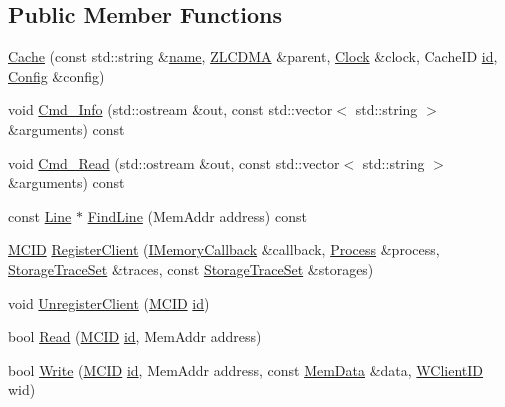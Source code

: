\subsection*{Public Member Functions}
\begin{DoxyCompactItemize}
\item 
\hyperlink{class_simulator_1_1_z_l_c_d_m_a_1_1_cache_a1271ba7cb3727476e32ca8c76d7e1892}{Cache} (const std\+::string \&\hyperlink{mtconf_8c_a8f8f80d37794cde9472343e4487ba3eb}{name}, \hyperlink{class_simulator_1_1_z_l_c_d_m_a}{Z\+L\+C\+D\+M\+A} \&parent, \hyperlink{class_simulator_1_1_clock}{Clock} \&clock, Cache\+I\+D \hyperlink{mtconf_8c_aa3185401f04d30bd505daebf48c39cc5}{id}, \hyperlink{class_config}{Config} \&config)
\item 
void \hyperlink{class_simulator_1_1_z_l_c_d_m_a_1_1_cache_acf2ead20e8ec442bba71b808a29d5930}{Cmd\+\_\+\+Info} (std\+::ostream \&out, const std\+::vector$<$ std\+::string $>$ \&arguments) const 
\item 
void \hyperlink{class_simulator_1_1_z_l_c_d_m_a_1_1_cache_a43d70f72b3ec0494194b17da3f5f6a74}{Cmd\+\_\+\+Read} (std\+::ostream \&out, const std\+::vector$<$ std\+::string $>$ \&arguments) const 
\item 
const \hyperlink{struct_simulator_1_1_z_l_c_d_m_a_1_1_cache_1_1_line}{Line} $\ast$ \hyperlink{class_simulator_1_1_z_l_c_d_m_a_1_1_cache_a909caa91fac1fb46cabe468337b57315}{Find\+Line} (Mem\+Addr address) const 
\item 
\hyperlink{namespace_simulator_a4b5747ff30c62c6373badf3b53b9abf7}{M\+C\+I\+D} \hyperlink{class_simulator_1_1_z_l_c_d_m_a_1_1_cache_af594e543ee2a0bb8d0a26a4b727b912c}{Register\+Client} (\hyperlink{class_simulator_1_1_i_memory_callback}{I\+Memory\+Callback} \&callback, \hyperlink{class_simulator_1_1_process}{Process} \&process, \hyperlink{class_simulator_1_1_storage_trace_set}{Storage\+Trace\+Set} \&traces, const \hyperlink{class_simulator_1_1_storage_trace_set}{Storage\+Trace\+Set} \&storages)
\item 
void \hyperlink{class_simulator_1_1_z_l_c_d_m_a_1_1_cache_a82892fed0ddbc4314f9e7e9a64774e15}{Unregister\+Client} (\hyperlink{namespace_simulator_a4b5747ff30c62c6373badf3b53b9abf7}{M\+C\+I\+D} \hyperlink{mtconf_8c_aa3185401f04d30bd505daebf48c39cc5}{id})
\item 
bool \hyperlink{class_simulator_1_1_z_l_c_d_m_a_1_1_cache_a9115d87db4e89be406d2c1ba9f06fe93}{Read} (\hyperlink{namespace_simulator_a4b5747ff30c62c6373badf3b53b9abf7}{M\+C\+I\+D} \hyperlink{mtconf_8c_aa3185401f04d30bd505daebf48c39cc5}{id}, Mem\+Addr address)
\item 
bool \hyperlink{class_simulator_1_1_z_l_c_d_m_a_1_1_cache_acaaefb6acade2910fdb2ba9bb9613a31}{Write} (\hyperlink{namespace_simulator_a4b5747ff30c62c6373badf3b53b9abf7}{M\+C\+I\+D} \hyperlink{mtconf_8c_aa3185401f04d30bd505daebf48c39cc5}{id}, Mem\+Addr address, const \hyperlink{struct_simulator_1_1_mem_data}{Mem\+Data} \&data, \hyperlink{namespace_simulator_a0de605c35951a450d074222efcef6359}{W\+Client\+I\+D} wid)
\end{DoxyCompactItemize}
